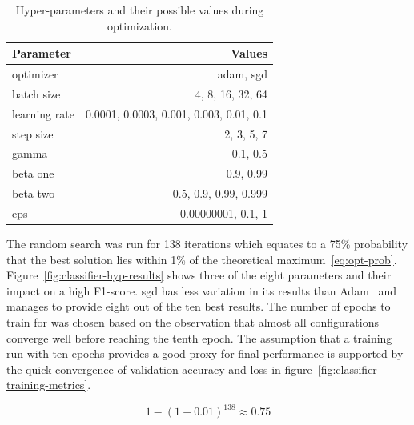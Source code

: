 \documentclass[draft,final]{vutinfth} %
\begin{document}
\begin{table}[h]
  \centering
  \begin{tabular}{lr}
    \toprule
    Parameter &  Values \\
    \midrule
    optimizer &	adam, sgd \\
    batch size & 4, 8, 16, 32, 64 \\
    learning rate & 0.0001, 0.0003, 0.001, 0.003, 0.01, 0.1 \\
    step size & 2, 3, 5, 7 \\
    gamma & 0.1, 0.5 \\
    beta one & 0.9, 0.99 \\
    beta two & 0.5, 0.9, 0.99, 0.999 \\
    eps & 0.00000001, 0.1, 1 \\
    \bottomrule
  \end{tabular}
  \caption{Hyper-parameters and their possible values during
    optimization.}
  \label{tab:classifier-hyps}
\end{table}

The random search was run for 138 iterations which equates to a 75\%
probability that the best solution lies within 1\% of the theoretical
maximum~\eqref{eq:opt-prob}. Figure~\ref{fig:classifier-hyp-results}
shows three of the eight parameters and their impact on a high
F1-score. \gls{sgd} has less variation in its results than
Adam~\cite{kingma2017} and manages to provide eight out of the ten
best results. The number of epochs to train for was chosen based on
the observation that almost all configurations converge well before
reaching the tenth epoch. The assumption that a training run with ten
epochs provides a good proxy for final performance is supported by the
quick convergence of validation accuracy and loss in
figure~\ref{fig:classifier-training-metrics}.

\begin{equation}\label{eq:opt-prob}
  1 - (1 - 0.01)^{138} \approx 0.75
\end{equation}
\end{document}
